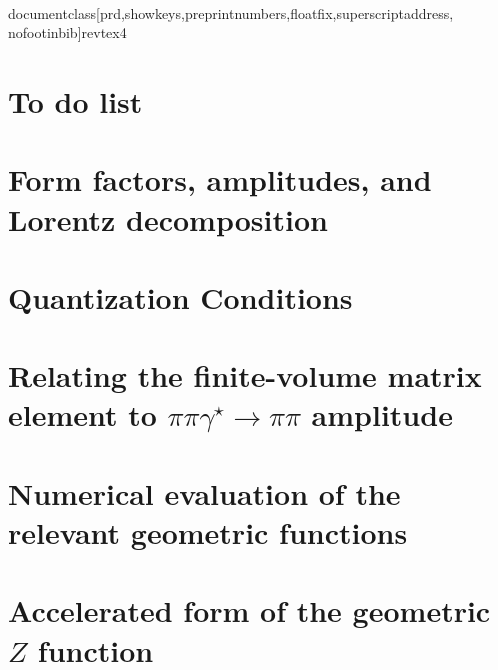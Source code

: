 \\documentclass[prd,showkeys,preprintnumbers,floatfix,superscriptaddress, nofootinbib]{revtex4}
\begin{document}

\nopagebreak
\maketitle

\tableofcontents

\clearpage

\section{To do list}


\section{Form factors, amplitudes, and Lorentz decomposition}


\section{Quantization Conditions}


\section{Relating the finite-volume matrix element to $\pi\pi\gamma^\star\to\pi\pi$ amplitude \label{sec:pipigs_pipi}}


\section{Numerical evaluation of the relevant geometric functions}


\appendix

\section{Accelerated form of the geometric $Z$ function}



\clearpage

\end{document}
